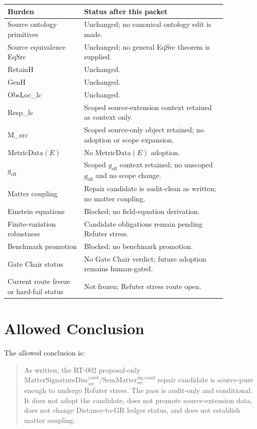 \documentclass[11pt]{article}
\newcommand{\MetricData}{\mathrm{MetricData}}
\newcommand{\geff}{g_{\mathrm{eff}}}
\newcommand{\SemMatterSig}{\mathrm{SemMatter}_{\mathrm{src}}^{\mathrm{sig\text{-}cand}}}
\newcommand{\MatSigDisc}{\mathrm{MatterSignatureDisc}_{\mathrm{src}}^{\mathrm{cand}}}
\begin{document}
\begin{longtable}{p{0.30\linewidth}p{0.56\linewidth}}
\toprule
Burden & Status after this packet \\
\midrule
Source ontology primitives & Unchanged; no canonical ontology edit is made. \\
Source equivalence EqSrc & Unchanged; no general EqSrc theorem is supplied. \\
RetainH & Unchanged. \\
GenH & Unchanged. \\
ObsLoc\_lc & Unchanged. \\
Resp\_lc & Scoped source-extension context retained as context only. \\
M\_src & Scoped source-only object retained; no adoption or scope expansion. \\
\(\MetricData(E)\) & No \(\MetricData(E)\) adoption. \\
\(\geff\) & Scoped \(\geff\) context retained; no unscoped \(\geff\) and no scope change. \\
Matter coupling & Repair candidate is audit-clean as written; no matter coupling. \\
Einstein equations & Blocked; no field-equation derivation. \\
Finite-variation robustness & Candidate obligations remain pending Refuter stress. \\
Benchmark promotion & Blocked; no benchmark promotion. \\
Gate Chair status & No Gate Chair verdict; future adoption remains human-gated. \\
Current route freeze or hard-fail status & Not frozen; Refuter stress route open. \\
\bottomrule
\end{longtable}

\section{Allowed Conclusion}

The allowed conclusion is:

\begin{quote}
As written, the RT-002 proposal-only
\(\MatSigDisc / \SemMatterSig\) repair candidate is source-pure enough to
undergo Refuter stress. The pass is audit-only and conditional. It does not
adopt the candidate, does not promote source-extension data, does not change
Distance-to-GR ledger status, and does not establish matter coupling.
\end{quote}
\end{document}
